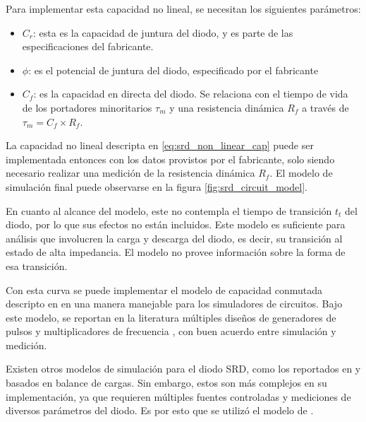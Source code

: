 Para implementar esta capacidad no lineal, se necesitan los siguientes
parámetros:

\begin{itemize}
    \item $C_r$: esta es la capacidad de juntura del diodo, y es parte de las
        especificaciones del fabricante.
    \item $\phi$: es el potencial de juntura del diodo, especificado por el
        fabricante
    \item $C_f$: es la capacidad en directa del diodo. Se relaciona con el
        tiempo de vida de los portadores minoritarios $\tau_m$ y una resistencia
        dinámica $R_f$ a través de $\tau_m = C_f \times R_f$.
        \cite{Kotzebue1965}
\end{itemize}

La capacidad no lineal descripta en \ref{eq:srd_non_linear_cap} puede ser
implementada entonces con los datos provistos por el fabricante, solo siendo
necesario realizar una medición de la resistencia dinámica $R_f$. El modelo de
simulación final puede observarse en la figura \ref{fig:srd_circuit_model}.

En cuanto al alcance del modelo, este no contempla el tiempo de transición $t_t$
del diodo, por lo que sus efectos no están incluidos. Este modelo es suficiente
para análisis que involucren la carga y descarga del diodo, es decir, su
transición al estado de alta impedancia. El modelo no provee información sobre
la forma de esa transición.

Con esta curva se puede implementar el modelo de capacidad conmutada descripto
en \cite{moll1969} en una manera manejable para los simuladores de circuitos.
Bajo este modelo, se reportan en la literatura múltiples diseños de generadores
de pulsos \cite{Ruengwaree2006} \cite{Rahman2022} y multiplicadores de
frecuencia \cite{zhang1996} \cite{Heymann2001}, con buen acuerdo entre
simulación y medición.

Existen otros modelos de simulación para el diodo SRD, como los reportados en
\cite{Opalska1997} y \cite{Shevchenko2022} basados en balance de cargas. Sin
embargo, estos son más complejos en su implementación, ya que requieren
múltiples fuentes controladas y mediciones de diversos parámetros del diodo. Es
por esto que se utilizó el modelo de \cite{zhang1995}.

